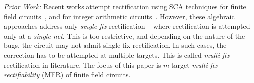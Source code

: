 
\par 
{\it Prior Work:}  
Recent works attempt rectification using SCA techniques for finite field 
circuits~\cite{Utkarsh:VLSI18,Vkrao:FMCAD18}, and for integer
arithmetic circuits~\cite{farimah:2017:1,MF_Rolf:ISVLSI18}. 
However, these algebraic approaches address only
{\it single-fix} rectification -- where rectification is attempted
only at a {\it single net}. This is too restrictive, and depending on
the nature of the bugs, the circuit may not admit single-fix
rectification. In such cases, the correction has to be
attempted at multiple targets. This is
called {\it multi-fix} rectification in literature. The focus of
this paper is $m$-target {\it multi-fix rectifiability} (MFR) of finite field circuits. 

